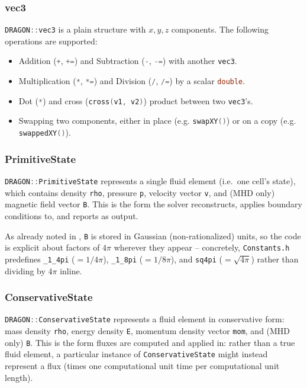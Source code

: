 \documentclass[11pt]{report}
\newcommand{\cpp}[1]{\lstinline[language=C++]{#1}}
\newcommand{\bash}[1]{\lstinline[language=bash]{#1}}
\begin{document}
\subsubsection{vec3}

\cpp{DRAGON::vec3} is a plain structure with $x,y,z$ components.
The following operations are supported:
\begin{itemize}
\item Addition (\cpp{+}, \cpp{+=}) and Subtraction  (\cpp{-}, \cpp{-=}) with another \cpp{vec3}.
\item Multiplication (\cpp{*}, \cpp{*=}) and Division  (\cpp{/}, \cpp{/=}) by a scalar \cpp{double}.
\item Dot (\cpp{*}) and cross (\cpp{cross(v1, v2)}) product between two \cpp{vec3}'s.
\item Swapping two components, either in place (e.g. \cpp{swapXY()}) or on a copy (e.g. \cpp{swappedXY()}).
\end{itemize}

\subsubsection{PrimitiveState}

\cpp{DRAGON::PrimitiveState} represents a single fluid element (i.e.\ one cell's state), which contains density \cpp{rho}, pressure \cpp{p}, velocity vector \cpp{v}, and (MHD only) magnetic field vector \cpp{B}. This is the form the solver reconstructs, applies boundary conditions to, and reports as output.

As already noted in , \cpp{B} is stored in Gaussian (non-rationalized) units, so the code is explicit about factors of $4\pi$ wherever they appear -- concretely, \bash{Constants.h} predefines \cpp{_1_4pi} ($=1/4\pi$), \cpp{_1_8pi} ($=1/8\pi$), and \cpp{sq4pi} ($=\sqrt{4\pi}$) rather than dividing by $4\pi$ inline. %

\subsubsection{ConservativeState}

\cpp{DRAGON::ConservativeState} represents a fluid element in conservative form: mass density \cpp{rho}, energy density \cpp{E}, momentum density vector \cpp{mom}, and (MHD only) \cpp{B}. This is the form fluxes are computed and applied in: rather than a true fluid element, a particular instance of \cpp{ConservativeState} might instead represent a flux (times one computational unit time per computational unit length).
\end{document}
